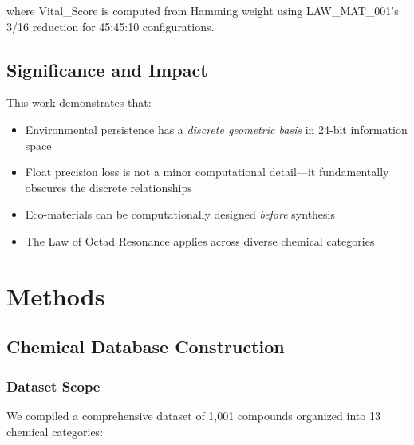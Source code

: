 \documentclass[11pt,letterpaper]{article}
\begin{document}
where Vital\_Score is computed from Hamming weight using LAW\_MAT\_001's 3/16 reduction for 45:45:10 configurations.

\subsection{Significance and Impact}

This work demonstrates that:
\begin{itemize}
    \item Environmental persistence has a \emph{discrete geometric basis} in 24-bit information space
    \item Float precision loss is not a minor computational detail---it fundamentally obscures the discrete relationships
    \item Eco-materials can be computationally designed \emph{before} synthesis
    \item The Law of Octad Resonance applies across diverse chemical categories
\end{itemize}

\section{Methods}

\subsection{Chemical Database Construction}

\subsubsection{Dataset Scope}

We compiled a comprehensive dataset of 1,001 compounds organized into 13 chemical categories:
\end{document}
